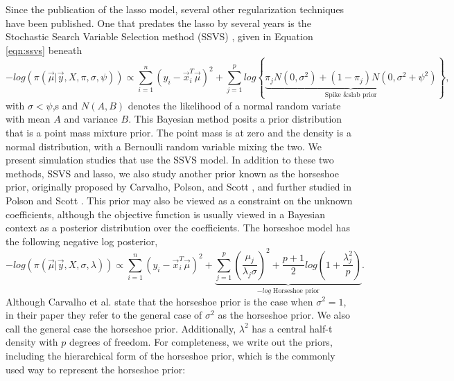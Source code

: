 Since the publication of the lasso model, several other regularization techniques have been published. One that predates the lasso by several years is the Stochastic Search Variable Selection method (SSVS) \cite{george1993variable}, given in Equation \ref{eqn:ssvs} beneath
	\begin{equation}\label{eqn:lasso_obj}
		-log(\pi(\vec{\mu} \vert \vec{y}, X, \pi, \sigma, \psi )) \propto \sum_{i=1}^n\left(y_i - \vec{x}_i^T\vec{\mu}\right)^2 + \sum_{j=1}^p log\left\{\underbrace{ \pi_jN(0, \sigma^2)+(1-\pi_j)N(0, \sigma^2+ \psi^2)}_{\text{Spike \& slab prior}}  \right\},
		\end{equation}
with $\sigma < \psi$,s and $N(A,B)$ denotes the likelihood of a normal random variate with mean $A$ and variance $B$. This Bayesian method posits a prior distribution that is a point mass mixture prior. The point mass is at zero and the density is a normal distribution, with a Bernoulli random variable mixing the two. %
We present simulation studies that use the SSVS model. In addition to these two methods, SSVS and lasso, we also study another prior known as the horseshoe prior, originally proposed by Carvalho, Polson, and Scott \cite{carvalho2010horseshoe}, and further studied in Polson and Scott \cite{polson2010shrink}. This prior may also be viewed as a constraint on the unknown coefficients, although the objective function is usually viewed in a Bayesian context as a posterior distribution over the coefficients. The horseshoe model has the following negative log posterior, 
\begin{equation}\label{eqn:horseshoe}
		-log(\pi(\vec{\mu} \vert \vec{y}, X, \sigma, \lambda )) \propto \sum_{i=1}^n\left(y_i - \vec{x}_i^T\vec{\mu}\right)^2 + \underbrace{\sum_{j=1}^p\left(\frac{\mu_j}{\lambda_j\sigma} \right)^2 + \frac{p+1}{2}log\left(1+ \frac{\lambda_j^2}{p}\right)}_{ \text{$-log$ Horseshoe prior} }.\end{equation}
\noindent Although Carvalho et al.  \cite{carvalho2010horseshoe} state that the horseshoe prior is the case when $\sigma^2=1$, in their paper they refer to the general case of $\sigma^2$ as the horseshoe prior. We also call the general case the horseshoe prior. Additionally, $\lambda^2$ has a central half-t density with $p$ degrees of freedom. For completeness, we write out the priors, including the hierarchical form of the horseshoe prior, which is the commonly used way to represent the horseshoe prior:
